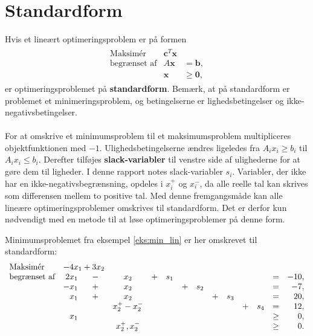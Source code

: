 \section{Standardform}
% 
Hvis et lineært optimeringsproblem er på formen
%
\begin{align*}
\begin{array}{lrl}
\text{Maksimér}		&\textbf{c}^T\textbf{x}	&				\\
\text{begrænset af}	&A\textbf{x}	&=\mathbf{b},	\\
					&\mathbf{x}				&\geq \mathbf{0},
\end{array}
\end{align*}
%
er optimeringsproblemet på \textbf{standardform}.
Bemærk, at på standardform er problemet et minimeringsproblem, og betingelserne er lighedsbetingelser og ikke-negativsbetingelser.\\\\
%
For at omskrive et minimumsproblem til et maksimumsproblem multipliceres objektfunktionen med $-1$.
Ulighedsbetingelserne ændres ligeledes fra $A_ix_i \geq b_i$ til $A_ix_i \leq b_i$.
Derefter tilføjes \textbf{slack-variabler} til venstre side af ulighederne for at gøre dem til ligheder.
I denne rapport notes slack-variabler $s_i$.
Variabler, der ikke har en ikke-negativsbegrænsning, opdeles i $x_i^+$ og $x_i^-$, da alle reelle tal kan skrives som differensen mellem to positive tal.
Med denne fremgangsmåde kan alle lineære optimeringsproblemer omskrives til standardform.
Det er derfor kun nødvendigt med en metode til at løse optimeringsproblemer på denne form.
%

%
\begin{eks}
Minimumsproblemet fra eksempel \ref{eks:min_lin} er her omskrevet til standardform:
%
\begin{align*}
\begin{array}{lrcccrcrcrcrcrcr}
\text{Maksimér}		&	\multicolumn{2}{c}{-4x_1 + 3x_2}\\
\text{begrænset af}	&2x_1	&-	&x_2		&+	&s_1&	&	&	&	&	&	&= 		&-10,\\
					&-x_1	&+	&x_2		&	&	&+	&s_2&	&	&	&	&=		& -7,\\
					&x_1	&+	&x_2		&	&	&	&	&+	&s_3&	&	&=		& 20,\\
					& 		&	&x_2^+-x_2^-&	&	&	&	&	&	&+	&s_4&=		& 12,\\
					&x_1	&	&			&	&	&	&	&	&	&	&	&\geq	& 0,\\
					&		&	&x_2^+,x_2^-&	&	&	&	&	&	&	&	&\geq	& 0.\\
\end{array}
\end{align*}
\end{eks}
%
